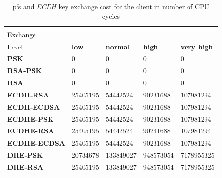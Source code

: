   \begin{table}[]
  \begin{tabular}{|l|l|l|l|l|}
  \hline
   \backslashbox{Key\\Exchange}{Security\\Level}                                           & \textbf{low}                    & \textbf{normal}                 & \textbf{high}                   & \textbf{very high}               \\ \hline
  \textbf{PSK}                               & 0                               & 0                               & 0                               & 0                                \\ \hline
  \textbf{RSA-PSK}                           & 0                               & 0                               & 0                               & 0                                \\ \hline
  \textbf{RSA}                               & 0                               & 0                               & 0                               & 0                                \\ \hline
  \rowcolor[HTML]{9B9B9B}
  {\color[HTML]{333333} \textbf{ECDH-RSA}}   & {\color[HTML]{333333} 25405195} & {\color[HTML]{333333} 54442524} & {\color[HTML]{333333} 90231688} & {\color[HTML]{333333} 107981294} \\ \hline
  \rowcolor[HTML]{9B9B9B}
  {\color[HTML]{333333} \textbf{ECDH-ECDSA}} & {\color[HTML]{333333} 25405195} & {\color[HTML]{333333} 54442524} & {\color[HTML]{333333} 90231688} & {\color[HTML]{333333} 107981294} \\ \hline
  \textbf{ECDHE-PSK}                         & 25405195                        & 54442524                        & 90231688                        & 107981294                        \\ \hline
  \textbf{ECDHE-RSA}                         & 25405195                        & 54442524                        & 90231688                        & 107981294                        \\ \hline
  \textbf{ECDHE-ECDSA}                       & 25405195                        & 54442524                        & 90231688                        & 107981294                        \\ \hline
  \textbf{DHE-PSK}                           & 20734678                        & 133849027                       & 948573054                        & 7178955325                        \\ \hline
  \textbf{DHE-RSA}                           & 25405195                        & 133849027                        & 948573054                        & 7178955325                        \\ \hline
  \end{tabular}
  \centering \caption{\label{table:pfs-cost-client} \gls{pfs} and \textit{ECDH} key exchange cost for the client in number of CPU cycles}
  \end{table}
  
